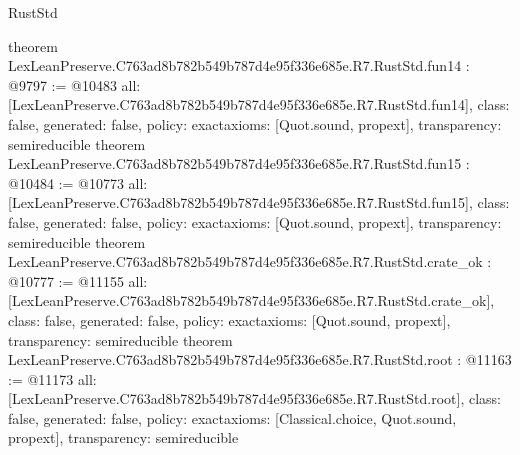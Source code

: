 \begin{lexlean}{RustStd}
\begin{coremodule}
{}
theorem LexLeanPreserve.C763ad8b782b549b787d4e95f336e685e.R7.RustStd.fun14 : @9797 := @10483 {
  all: [LexLeanPreserve.C763ad8b782b549b787d4e95f336e685e.R7.RustStd.fun14],
  class: false,
  generated: false,
  policy: exact{axioms: [Quot.sound, propext]},
  transparency: semireducible
}
theorem LexLeanPreserve.C763ad8b782b549b787d4e95f336e685e.R7.RustStd.fun15 : @10484 := @10773 {
  all: [LexLeanPreserve.C763ad8b782b549b787d4e95f336e685e.R7.RustStd.fun15],
  class: false,
  generated: false,
  policy: exact{axioms: [Quot.sound, propext]},
  transparency: semireducible
}
theorem LexLeanPreserve.C763ad8b782b549b787d4e95f336e685e.R7.RustStd.crate_ok : @10777 := @11155 {
  all: [LexLeanPreserve.C763ad8b782b549b787d4e95f336e685e.R7.RustStd.crate_ok],
  class: false,
  generated: false,
  policy: exact{axioms: [Quot.sound, propext]},
  transparency: semireducible
}
theorem LexLeanPreserve.C763ad8b782b549b787d4e95f336e685e.R7.RustStd.root : @11163 := @11173 {
  all: [LexLeanPreserve.C763ad8b782b549b787d4e95f336e685e.R7.RustStd.root],
  class: false,
  generated: false,
  policy: exact{axioms: [Classical.choice, Quot.sound, propext]},
  transparency: semireducible
}


\end{coremodule}
\end{lexlean}
